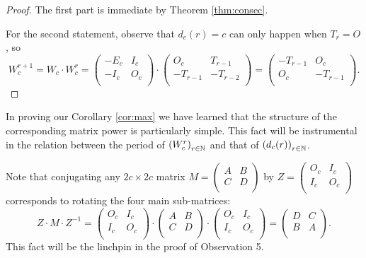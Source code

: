 \begin{proof}
The first part is immediate by Theorem \ref{thm:consec}.

For the second statement, observe that $d_c(r)=c$ can only happen
when $T_r=O$, so
  $$W_{c}^{r+1} = W_c\cdot W_c^r=
\left(\begin{matrix} -E_{c} & I_c \\ -I_{c} & O_c \\\end{matrix}\right)\cdot
\left(\begin{matrix} O_c & T_{r-1} \\ -T_{r-1} & -T_{r-2} \\\end{matrix}\right)=
\left(\begin{matrix} -T_{r-1} & O_c \\ O_c & -T_{r-1} \\\end{matrix}
\right).$$
\end{proof}
In proving our Corollary \ref{cor:max} we have learned that the
structure of the corresponding matrix power is particularly simple. 
This fact will
be instrumental in the relation between the period of
$\left(W_{c}^{r}\right)_{r\in\mathbb{N}}$ and that of
$\left(d_{c}(r)\right)_{r\in\mathbb{N}}$.

Note that conjugating any $2c\times 2c$ matrix $M=
\left(\begin{smallmatrix} A & B \\ C & D \\\end{smallmatrix}\right)$ by
$Z=\left(\begin{smallmatrix} O_c & I_c \\ I_c & O_c \\\end{smallmatrix}\right)$ 
corresponds to rotating the four main sub-matrices:
\begin{equation}\label{eq:rotate}
Z\cdot M\cdot Z^{-1}=\left(\begin{matrix} O_c & I_c \\ I_c & O_c \\\end{matrix}\right)
\cdot
\left(\begin{matrix} A & B \\ C & D \\\end{matrix}\right)
\cdot
\left(\begin{matrix} O_c & I_c \\ I_c & O_c \\\end{matrix}\right)
=
\left(\begin{matrix} D & C \\ B & A \\\end{matrix}\right).\end{equation}
This fact will be the linchpin in the proof of Observation 5.


